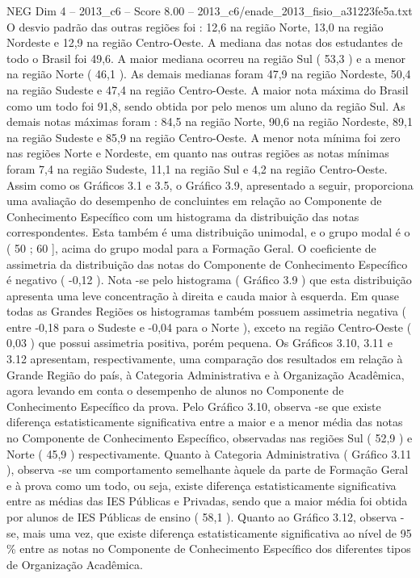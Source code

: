 \begin{textsample}{NEG Dim 4 – 2013\_c6 – Score 8.00 – 2013\_c6/enade\_2013\_fisio\_a31223fe5a.txt}
O desvio padrão das outras regiões foi : 12,6 na região Norte, 13,0 na região Nordeste e 12,9 na região Centro-Oeste.
A mediana das notas dos estudantes de todo o Brasil foi 49,6.
A maior mediana ocorreu na região Sul ( 53,3 ) e a menor na região Norte ( 46,1 ).
As demais medianas foram 47,9 na região Nordeste, 50,4 na região Sudeste e 47,4 na região Centro-Oeste.
A maior nota máxima do Brasil como um todo foi 91,8, sendo obtida por pelo menos um aluno da região Sul.
As demais notas máximas foram : 84,5 na região Norte, 90,6 na região Nordeste, 89,1 na região Sudeste e 85,9 na região Centro-Oeste.
A menor nota mínima foi zero nas regiões Norte e Nordeste, em quanto nas outras regiões as notas mínimas foram 7,4 na região Sudeste, 11,1 na região Sul e 4,2 na região Centro-Oeste.
Assim como os Gráficos 3.1 e 3.5, o Gráfico 3.9, apresentado a seguir, proporciona uma avaliação do desempenho de concluintes em relação ao Componente de Conhecimento Específico com um histograma da distribuição das notas correspondentes.
Esta também é uma distribuição unimodal, e o grupo modal é o ( 50 ; 60 ], acima do grupo modal para a Formação Geral.
O coeficiente de assimetria da distribuição das notas do Componente de Conhecimento Específico é negativo ( -0,12 ).
Nota -se pelo histograma ( Gráfico 3.9 ) que esta distribuição apresenta uma leve concentração à direita e cauda maior à esquerda.
Em quase todas as Grandes Regiões os histogramas também possuem assimetria negativa ( entre -0,18 para o Sudeste e -0,04 para o Norte ), exceto na região Centro-Oeste ( 0,03 ) que possui assimetria positiva, porém pequena.
Os Gráficos 3.10, 3.11 e 3.12 apresentam, respectivamente, uma comparação dos resultados em relação à Grande Região do país, à Categoria Administrativa e à Organização Acadêmica, agora levando em conta o desempenho de alunos no Componente de Conhecimento Específico da prova.
Pelo Gráfico 3.10, observa -se que existe diferença estatisticamente significativa entre a maior e a menor média das notas no Componente de Conhecimento Específico, observadas nas regiões Sul ( 52,9 ) e Norte ( 45,9 ) respectivamente.
Quanto à Categoria Administrativa ( Gráfico 3.11 ), observa -se um comportamento semelhante àquele da parte de Formação Geral e à prova como um todo, ou seja, existe diferença estatisticamente significativa entre as médias das IES Públicas e Privadas, sendo que a maior média foi obtida por alunos de IES Públicas de ensino ( 58,1 ).
Quanto ao Gráfico 3.12, observa -se, mais uma vez, que existe diferença estatisticamente significativa ao nível de 95 \% entre as notas no Componente de Conhecimento Específico dos diferentes tipos de Organização Acadêmica.

\end{textsample}
